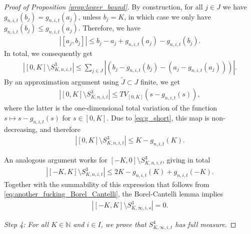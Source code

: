 \documentclass[11pt]{article}
\numberwithin{statement}{section}
\numberwithin{equation}{section}
\theoremstyle{remark}
\newcommand{\N}{\mathbb N}
\begin{document}
\begin{proof}[Proof of Proposition \ref{prop:lower_bound}]
          By construction, for all $j \in J$ we have
          $g_{n,i,t}(b_j) = g_{n,i,t}(a_j)$, unless $b_j = K$, in
          which case we only have
          $g_{n,i,t}(b_j) \leq g_{n,i,t}(a_j)$.  Therefore, we have
	\begin{align}
		| [a_j,b_j] | \leq  b_j  - a_j + g_{n,i,t}(a_j) - g_{n,i,t}(b_j).
	\end{align}
	In total, we consequently get
	\begin{align}
		\left|  [0,K] \setminus S^3_{K,n,i,t}\right| \leq
          \sum_{j\in J} \left| \left( b_j - g_{n,i,t}(b_j) - \left(
          a_j - g_{n,i,t}(a_j)\right) \right) \right|. 
	\end{align}
	By an approximation argument using $\tilde J \subset J$
        finite, we get
	\begin{align}
          \left|  [0,K] \setminus S^3_{K,n,i,t} \right|  \leq
          TV_{[0,K]}(s -g_{n,i,t}(s)),  
	\end{align}
	where the latter is the one-dimensional total variation of the
        function $s \mapsto s -g_{n,i,t}(s)$ for $s \in [0,K]$.  Due
        to
        \eqref{eq:g_short}, this map is non-decreasing, and therefore
	\begin{align}
          \left|   [0,K] \setminus S^3_{K,n,i,t}\right|  \leq
         K - g_{n,i,t}(K). 
	\end{align}
	
	An analogous argument works for
        $[-K,0] \setminus S^3_{K,n,i,t}$, giving in total
	\begin{align}
          \left| [-K,K] \setminus S^3_{K,n,i,t} \right| \leq 2 K
          - g_{n,i,t}(K) + g_{n,i,t}(-K). 
	\end{align}
	Together with the summability of this expression that
          follows from \eqref{eq:another_fucking_Borel_Cantelli}, the
        Borel-Cantelli lemma implies
	\begin{align}\label{eq:S3_full}
          |[-K,K]\setminus S^3_{K,\infty,i,s}| =0.
	\end{align}
	
	\textit{Step 4: For all $K \in \N$ and $i \in I$, we prove
          that $S^4_{K,\infty,i,t}$ has full measure.}
	

\end{proof}
\end{document}
